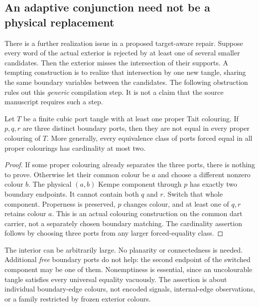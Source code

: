 \subsection{An adaptive conjunction need not be a physical replacement}
\label{sec:physical-support-intersection}

There is a further realization issue in a proposed target-aware repair.
Suppose every word of the actual exterior is rejected by at least one of
several smaller candidates. Then the exterior misses the intersection of
their supports. A tempting construction is to realize that intersection by
one new tangle, sharing the same boundary variables between the candidates.
The following obstruction rules out this \emph{generic} compilation step.
It is not a claim that the source manuscript requires such a step.

\begin{theorem}
Let $T$ be a finite cubic port tangle with at least one proper Tait
colouring. If $p,q,r$ are three distinct boundary ports, then they are not
equal in every proper colouring of $T$. More generally, every equivalence
class of ports forced equal in all proper colourings has cardinality at
most two.
\end{theorem}

\begin{proof}
If some proper colouring already separates the three ports, there is
nothing to prove. Otherwise let their common colour be $a$ and choose a
different nonzero colour $b$. The physical $(a,b)$ Kempe component through
$p$ has exactly two boundary endpoints. It cannot contain both $q$ and
$r$. Switch that whole component. Properness is preserved, $p$ changes
colour, and at least one of $q,r$ retains colour $a$. This is an actual
colouring construction on the common dart carrier, not a separately chosen
boundary matching.
The cardinality assertion follows by choosing three ports from any larger
forced-equality class.
\end{proof}

The interior can be arbitrarily large. No planarity or connectedness is
needed. Additional \emph{free} boundary ports do not help: the second
endpoint of the switched component may be one of them. Nonemptiness is
essential, since an uncolourable tangle satisfies every universal equality
vacuously. The assertion is about individual boundary-edge colours, not
encoded signals, internal-edge observations, or a family restricted by
frozen exterior colours.

